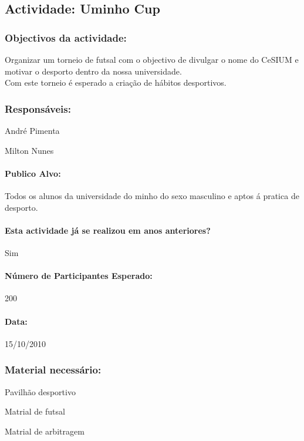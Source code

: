 \subsection{Actividade: Uminho Cup} %

\subsubsection*{Objectivos da actividade:}
Organizar um torneio de futsal com o objectivo de divulgar o nome do CeSIUM e motivar o desporto dentro da nossa universidade.\\
Com este torneio é esperado a criação de hábitos desportivos.

\subsubsection*{Responsáveis:}
\begin{itemizedash}
	\item{André Pimenta}
	\item{Milton Nunes}
\end{itemizedash}

\paragraph{Publico Alvo: }
Todos os alunos da universidade do minho do sexo masculino e aptos á pratica de desporto.

\paragraph{Esta actividade já se realizou em anos anteriores?}
Sim

\paragraph{Número de Participantes Esperado:}
200

\paragraph{Data:} 15/10/2010

\subsubsection*{Material necessário:}
\begin{itemizedash}
	\item{Pavilhão desportivo}
	\item{Matrial de futsal}
	\item{Matrial de arbitragem}
\end{itemizedash}


